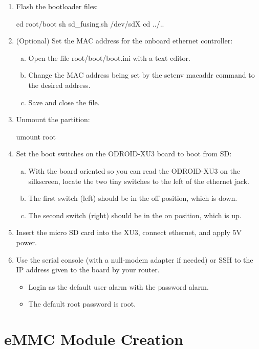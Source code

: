 \begin{enumerate}
\item Flash the bootloader files:

\begin{bashcode}
cd root/boot
sh sd_fusing.sh /dev/sdX
cd ../..
\end{bashcode}


\item    (Optional) Set the MAC address for the onboard ethernet controller:
    \begin{enumerate}[a.]
        \item Open the file root/boot/boot.ini with a text editor.
        \item Change the MAC address being set by the setenv macaddr command to the desired address.
        \item Save and close the file.
    \end{enumerate}

\item    Unmount the partition:

    umount root

\item    Set the boot switches on the ODROID-XU3 board to boot from SD:
    \begin{enumerate}[a.]
        \item With the board oriented so you can read the ODROID-XU3 on the silkscreen, locate the two tiny switches to the left of the ethernet jack.
        \item The first switch (left) should be in the off position, which is down.
        \item The second switch (right) should be in the on position, which is up.
    \end{enumerate}
    
\item    Insert the micro SD card into the XU3, connect ethernet, and apply 5V power.
\item    Use the serial console (with a null-modem adapter if needed) or SSH to the IP address given to the board by your router.
    \begin{itemize}
        \item Login as the default user alarm with the password alarm.
        \item The default root password is root.
    \end{itemize}

\end{enumerate}

\section{eMMC Module Creation}

